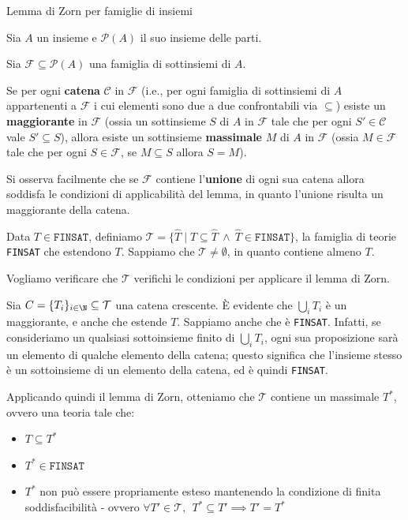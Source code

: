 \documentclass[a4paper,11pt]{report}
\begin{document}
\begin{lemmaframe}{Lemma di Zorn per famiglie di insiemi}{}

Sia $A$ un insieme e $\mathcal{P}(A)$ il suo insieme delle parti. 

Sia $\mathcal{F} \subseteq \mathcal{P}(A)$ una famiglia di sottinsiemi di $A$. 

Se per ogni \textbf{catena} $\mathcal{C}$ in $\mathcal{F}$ (i.e., per ogni famiglia di sottinsiemi di $A$ appartenenti a $\mathcal{F}$ i cui elementi sono due a due confrontabili via $\subseteq$) esiste un \textbf{maggiorante} in $\mathcal{F}$ (ossia un sottinsieme $S$ di $A$ in $\mathcal{F}$ tale che per ogni $S' \in \mathcal{C}$ vale $S' \subseteq S$), allora esiste un sottinsieme \textbf{massimale} $M$ di $A$ in $\mathcal{F}$ (ossia $M \in \mathcal{F}$ tale che per ogni $S \in \mathcal{F}$, se $M \subseteq S$ allora $S = M$).

\begin{gframe}{}
    Si osserva facilmente che se $\mathcal{F}$ contiene l'\textbf{unione} di ogni sua catena allora soddisfa le condizioni di applicabilità del lemma, in quanto l'unione risulta un maggiorante della catena.

\end{gframe}

\end{lemmaframe}

Data \( T \in \texttt{FINSAT} \), definiamo \( \mathcal{T} = \{\hat T \mid T \subseteq \hat T \ \land \  \hat T \in \texttt{FINSAT}\} \), la famiglia di teorie \texttt{FINSAT} che estendono \( T \). Sappiamo che \( \mathcal{T}\neq \emptyset \), in quanto contiene almeno \( T \).

Vogliamo verificare che \( \mathcal{T} \) verifichi le condizioni per applicare il lemma di Zorn.

Sia \( C = \{T_i\}_{i\in \N} \subseteq \mathcal{T} \) una catena crescente. È evidente che \( \bigcup_i T_i\) è un maggiorante, e anche che estende \(T\). Sappiamo anche che è \texttt{FINSAT}. Infatti, se consideriamo un qualsiasi sottoinsieme finito di \( \bigcup_i T_i\), ogni sua proposizione sarà un elemento di qualche elemento della catena; questo significa che l'insieme stesso è un sottoinsieme di un elemento della catena, ed è quindi \texttt{FINSAT}.

Applicando quindi il lemma di Zorn, otteniamo che \( \mathcal{T} \) contiene un massimale \( T^* \), ovvero una teoria tale che:
\begin{itemize}
    \item \( T \subseteq T^* \)
    \item \( T^* \in \texttt{FINSAT}\)
    \item \( T^* \) non può essere propriamente esteso mantenendo la condizione di finita soddisfacibilità - ovvero \( \forall T' \in \mathcal{T}, \ \ T^* \subseteq T' \implies T' = T^* \)
\end{itemize}
\end{document}

